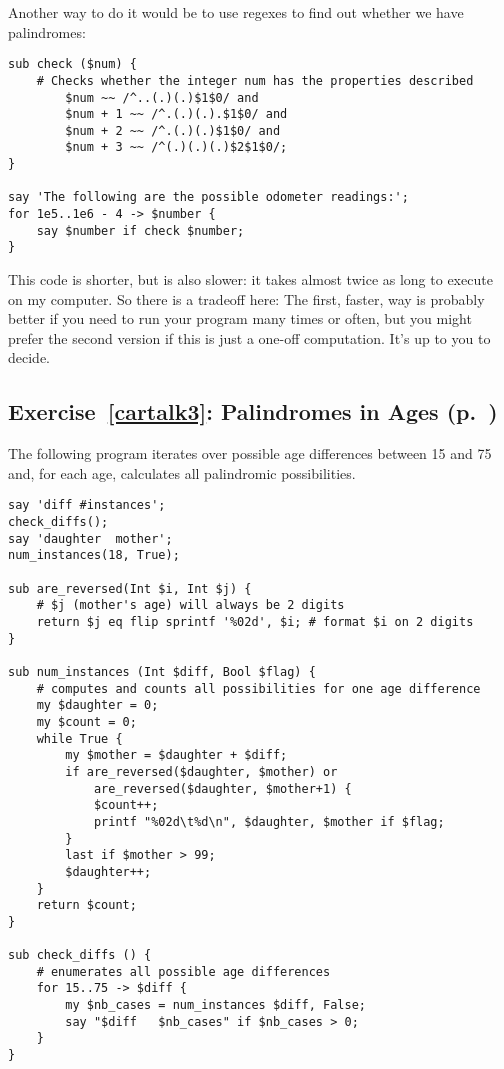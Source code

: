 Another way to do it would be to use regexes to find out whether 
we have palindromes:

\begin{verbatim}
sub check ($num) {
    # Checks whether the integer num has the properties described
        $num ~~ /^..(.)(.)$1$0/ and 
        $num + 1 ~~ /^.(.)(.).$1$0/ and 
        $num + 2 ~~ /^.(.)(.)$1$0/ and 
        $num + 3 ~~ /^(.)(.)(.)$2$1$0/;
}

say 'The following are the possible odometer readings:';
for 1e5..1e6 - 4 -> $number {
    say $number if check $number;
}
\end{verbatim}

This code is shorter, but is also slower: it takes almost twice 
as long to execute on my computer. So there is a tradeoff here: 
The first, faster, way is probably better if you need to run 
your program many times or often, but you might prefer the second 
version if this is just a one-off computation. It's up to you to 
decide.


\subsection{Exercise~\ref{cartalk3}: Palindromes in Ages (p.~\pageref{cartalk3})}
\label{sol_cartalk3}

The following program iterates over possible age differences 
between 15 and 75 and, for each age, calculates all 
palindromic possibilities.

\begin{verbatim}
say 'diff #instances';
check_diffs();
say 'daughter  mother';
num_instances(18, True);

sub are_reversed(Int $i, Int $j) {
    # $j (mother's age) will always be 2 digits
    return $j eq flip sprintf '%02d', $i; # format $i on 2 digits
}

sub num_instances (Int $diff, Bool $flag) {
    # computes and counts all possibilities for one age difference
    my $daughter = 0;
    my $count = 0;
    while True {
        my $mother = $daughter + $diff;
        if are_reversed($daughter, $mother) or 
		    are_reversed($daughter, $mother+1) {
            $count++;
            printf "%02d\t%d\n", $daughter, $mother if $flag;
        }
        last if $mother > 99;
        $daughter++;
    }
    return $count;
}

sub check_diffs () {
    # enumerates all possible age differences
    for 15..75 -> $diff {
        my $nb_cases = num_instances $diff, False;
        say "$diff   $nb_cases" if $nb_cases > 0;
    }
}
\end{verbatim}

